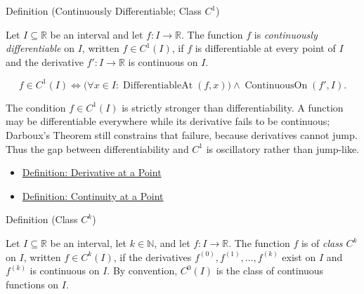 \begin{definitionbox}{Definition (Continuously Differentiable; Class \(C^1\))}
\begin{definition}
\label{def:class-c1}
Let \(I\subseteq\mathbb{R}\) be an interval and let \(f:I\to\mathbb{R}\). The function \(f\) is \emph{continuously differentiable} on \(I\), written \(f\in C^1(I)\), if \(f\) is differentiable at every point of \(I\) and the derivative \(f':I\to\mathbb{R}\) is continuous on \(I\).
\end{definition}
\end{definitionbox}

\begin{remark*}
\[
  f\in C^1(I)
  \Longleftrightarrow
  \bigl(\forall x\in I:\operatorname{DifferentiableAt}(f,x)\bigr)
  \land
  \operatorname{ContinuousOn}(f',I).
\]
\end{remark*}

\begin{remark*}[Interpretation]
The condition \(f\in C^1(I)\) is strictly stronger than differentiability. A function may be differentiable everywhere while its derivative fails to be continuous; Darboux's Theorem still constrains that failure, because derivatives cannot jump. Thus the gap between differentiability and \(C^1\) is oscillatory rather than jump-like.
\end{remark*}

\begin{dependencies}
\begin{itemize}
  \item \hyperref[def:derivative-at-a-point]{Definition: Derivative at a Point}
  \item \hyperref[def:continuous-at-point]{Definition: Continuity at a Point}
\end{itemize}
\end{dependencies}

\begin{definitionbox}{Definition (Class \(C^k\))}
\begin{definition}[Class \(C^k\)]
\label{def:class-ck}
Let \(I\subseteq\mathbb{R}\) be an interval, let \(k\in\mathbb{N}\), and let \(f:I\to\mathbb{R}\). The function \(f\) is of \emph{class \(C^k\)} on \(I\), written \(f\in C^k(I)\), if the derivatives \(f^{(0)},f^{(1)},\ldots,f^{(k)}\) exist on \(I\) and \(f^{(k)}\) is continuous on \(I\). By convention, \(C^0(I)\) is the class of continuous functions on \(I\).
\end{definition}
\end{definitionbox}

